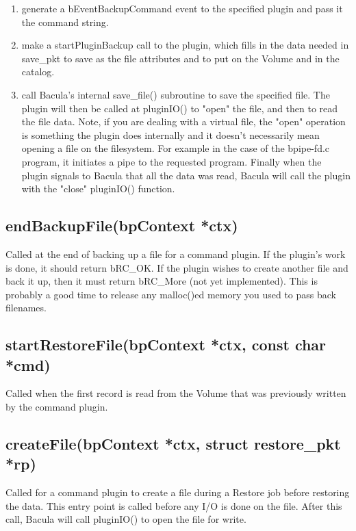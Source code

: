\begin{enumerate}
 \item generate a bEventBackupCommand event to the specified plugin
       and pass it the command string.
 \item make a startPluginBackup call to the plugin, which
       fills in the data needed in save\_pkt to save as the file
       attributes and to put on the Volume and in the catalog.
 \item call Bacula's internal save\_file() subroutine to save the specified
       file.  The plugin will then be called at pluginIO() to "open"
       the file, and then to read the file data.
       Note, if you are dealing with a virtual file, the "open" operation
       is something the plugin does internally and it doesn't necessarily
       mean opening a file on the filesystem.  For example in the case of
       the bpipe-fd.c program, it initiates a pipe to the requested program.
       Finally when the plugin signals to Bacula that all the data was read,
       Bacula will call the plugin with the "close" pluginIO() function.
\end{enumerate}


\subsection{endBackupFile(bpContext *ctx)}
Called at the end of backing up a file for a command plugin.  If the plugin's
work is done, it should return bRC\_OK.  If the plugin wishes to create another
file and back it up, then it must return bRC\_More (not yet implemented).  This
is probably a good time to release any malloc()ed memory you used to pass back
filenames.

\subsection{startRestoreFile(bpContext *ctx, const char *cmd)}
Called when the first record is read from the Volume that was 
previously written by the command plugin.

\subsection{createFile(bpContext *ctx, struct restore\_pkt *rp)}
Called for a command plugin to create a file during a Restore job before 
restoring the data. 
This entry point is called before any I/O is done on the file.  After
this call, Bacula will call pluginIO() to open the file for write.

